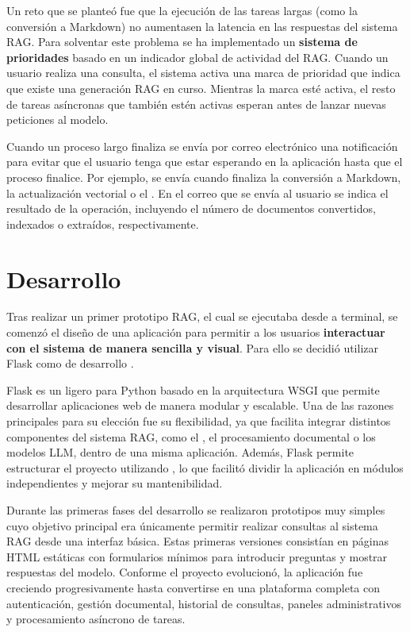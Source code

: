 Un reto que se planteó fue que la ejecución de las tareas largas (como la conversión a Markdown) no aumentasen la latencia en las respuestas del sistema RAG. Para solventar este problema se ha implementado un \textbf{sistema de prioridades} basado en un indicador global de actividad del RAG. Cuando un usuario realiza una consulta, el sistema activa una marca de prioridad que indica que existe una generación RAG en curso. Mientras la marca esté activa, el resto de tareas asíncronas que también estén activas esperan antes de lanzar nuevas peticiones al modelo. 

Cuando un proceso largo finaliza se envía por correo electrónico una notificación para evitar que el usuario tenga que estar esperando en la aplicación hasta que el proceso finalice. Por ejemplo, se envía cuando finaliza la conversión a Markdown, la actualización vectorial o el . En el correo que se envía al usuario se  indica el resultado de la operación, incluyendo el número de documentos convertidos, indexados o extraídos, respectivamente. 

\section{Desarrollo }

Tras realizar un primer prototipo RAG, el cual se ejecutaba desde a terminal, se comenzó el diseño de una aplicación  para permitir a los usuarios \textbf{interactuar con el sistema de manera sencilla y visual}. Para ello se decidió utilizar Flask como  de desarrollo . 

Flask es un  ligero para Python basado en la arquitectura WSGI que permite desarrollar aplicaciones web de manera modular y escalable. Una de las razones principales para su elección fue su flexibilidad, ya que facilita integrar distintos componentes del sistema RAG, como el , el procesamiento documental o los modelos LLM, dentro de una misma aplicación. Además, Flask permite estructurar el proyecto utilizando , lo que facilitó dividir la aplicación en módulos independientes y mejorar su mantenibilidad.

Durante las primeras fases del desarrollo  se realizaron prototipos muy simples cuyo objetivo principal era únicamente permitir realizar consultas al sistema RAG desde una interfaz básica. Estas primeras versiones consistían en páginas HTML estáticas con formularios mínimos para introducir preguntas y mostrar respuestas del modelo. Conforme el proyecto evolucionó, la aplicación fue creciendo progresivamente hasta convertirse en una plataforma  completa con autenticación, gestión documental, historial de consultas, paneles administrativos y procesamiento asíncrono de tareas.

